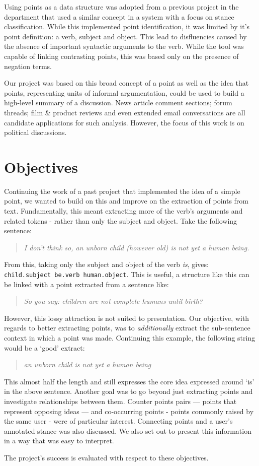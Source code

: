     Using points as a data structure was adopted from a previous project in the department that used a similar concept in a system with a focus on stance classification. While this implemented point identification, it was limited by it's point definition: a verb, subject and object. This lead to disfluencies caused by the absence of important syntactic arguments to the verb. While the tool was capable of linking contrasting points, this was based only on the presence of negation terms.

    Our project was based on this broad concept of a point as well as the idea that points, representing units of informal argumentation, could be used to build a high-level summary of a discussion. News article comment sections; forum threads; film \& product reviews and even extended email conversations are all candidate applications for such analysis. However, the focus of this work is on political discussions.

  \section{Objectives}
    Continuing the work of a past project that implemented the idea of a simple point, we wanted to build on this and improve on the extraction of points from text. Fundamentally, this meant extracting more of the verb's arguments and related tokens - rather than only the subject and object. Take the following sentence:

    \medskip
    \begin{center}
    \blockquote{\textit{I don't think so, an unborn child (however old) is not yet a human being.}}
    \end{center}
    \medskip

    From this, taking only the subject and object of the verb \textit{is}, gives: \texttt{child.subject be.verb human.object}. This is useful, a structure like this can be linked with a point extracted from a sentence like: \blockquote{\textit{So you say: children are not complete humans until birth?}}. However, this lossy attraction is not suited to presentation. Our objective, with regards to better extracting points, was to \textit{additionally} extract the sub-sentence context in which a point was made. Continuing this example, the following string would be a `good' extract:

    \medskip
    \begin{center}
    \blockquote{\textit{an unborn child is not yet a human being}}
    \end{center}
    \medskip

    This almost half the length and still expresses the core idea expressed around `is' in the above sentence. Another goal was to go beyond just extracting points and investigate relationships between them. Counter points pairs --- points that represent opposing ideas --- and co-occurring points - points commonly raised by the same user - were of particular interest. Connecting points and a user's annotated stance was also discussed. We also set out to present this information in a way that was easy to interpret.

    \medskip

    The project's success is evaluated with respect to these objectives.
